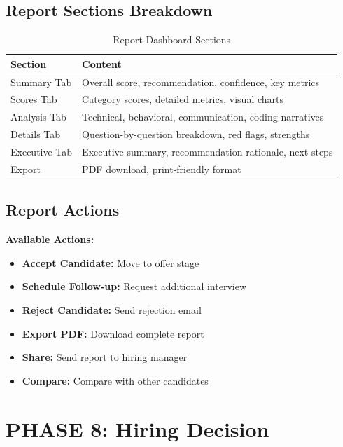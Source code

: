 \documentclass[12pt,a4paper]{article}
\begin{document}
\newpage

\subsection{Report Sections Breakdown}

\begin{table}[h!]
\centering
\begin{tabular}{|l|p{10cm}|}
\hline
\textbf{Section} & \textbf{Content} \\
\hline
Summary Tab & Overall score, recommendation, confidence, key metrics \\
\hline
Scores Tab & Category scores, detailed metrics, visual charts \\
\hline
Analysis Tab & Technical, behavioral, communication, coding narratives \\
\hline
Details Tab & Question-by-question breakdown, red flags, strengths \\
\hline
Executive Tab & Executive summary, recommendation rationale, next steps \\
\hline
Export & PDF download, print-friendly format \\
\hline
\end{tabular}
\caption{Report Dashboard Sections}
\end{table}

\subsection{Report Actions}

\textbf{Available Actions:}
\begin{itemize}
    \item \textbf{Accept Candidate:} Move to offer stage
    \item \textbf{Schedule Follow-up:} Request additional interview
    \item \textbf{Reject Candidate:} Send rejection email
    \item \textbf{Export PDF:} Download complete report
    \item \textbf{Share:} Send report to hiring manager
    \item \textbf{Compare:} Compare with other candidates
\end{itemize}

\newpage

\section{PHASE 8: Hiring Decision}
\end{document}
